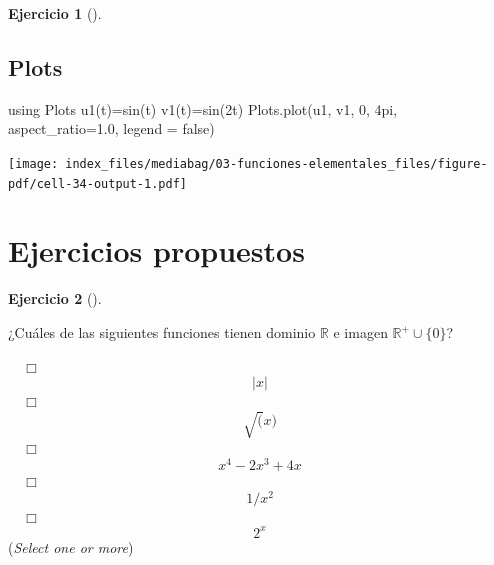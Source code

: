 \documentclass[
  a4paper,
]{scrreport}
\newenvironment{Shaded}{\begin{snugshade}}{\end{snugshade}}
\newcommand{\BuiltInTok}[1]{\textcolor[rgb]{0.00,0.23,0.31}{#1}}
\newcommand{\ConstantTok}[1]{\textcolor[rgb]{0.56,0.35,0.01}{#1}}
\newcommand{\FloatTok}[1]{\textcolor[rgb]{0.68,0.00,0.00}{#1}}
\newcommand{\FunctionTok}[1]{\textcolor[rgb]{0.28,0.35,0.67}{#1}}
\newcommand{\ImportTok}[1]{\textcolor[rgb]{0.00,0.46,0.62}{#1}}
\newcommand{\NormalTok}[1]{\textcolor[rgb]{0.00,0.23,0.31}{#1}}
\newcommand{\OperatorTok}[1]{\textcolor[rgb]{0.37,0.37,0.37}{#1}}
\theoremstyle{definition}
\newtheorem{exercise}{Ejercicio}[chapter]
\theoremstyle{remark}
\begin{document}
\begin{exercise}[]
\begin{tcolorbox}
\section{Plots}

\begin{Shaded}
\begin{Highlighting}[]
\ImportTok{using} \BuiltInTok{Plots}
\FunctionTok{u1}\NormalTok{(t)}\OperatorTok{=}\FunctionTok{sin}\NormalTok{(t)}
\FunctionTok{v1}\NormalTok{(t)}\OperatorTok{=}\FunctionTok{sin}\NormalTok{(}\FloatTok{2}\NormalTok{t)}
\NormalTok{Plots.}\FunctionTok{plot}\NormalTok{(u1, v1, }\FloatTok{0}\NormalTok{, }\FloatTok{4}\NormalTok{pi, aspect\_ratio}\OperatorTok{=}\FloatTok{1.0}\NormalTok{, legend }\OperatorTok{=} \ConstantTok{false}\NormalTok{)}
\end{Highlighting}
\end{Shaded}

\texttt{[image: index\_files/mediabag/03-funciones-elementales\_files/figure-pdf/cell-34-output-1.pdf]}

\end{tcolorbox}

\end{exercise}

\section{Ejercicios propuestos}\label{ejercicios-propuestos-1}

\begin{exercise}[]\protect\hypertarget{exr-dominio-imagen}{}\label{exr-dominio-imagen}

¿Cuáles de las siguientes funciones tienen dominio \(\mathbb{R}\) e
imagen \(\mathbb{R}^+\cup\{0\}\)?

${\quad\Box}$ $$|x|$$
${\quad\Box}$ $$\sqrt(x)$$
${\quad\Box}$ $$x^4-2x^3+4x$$
${\quad\Box}$ $$1/x^2$$
${\quad\Box}$ $$2^x$$
(\emph{Select one or more})

\end{exercise}
\end{document}

